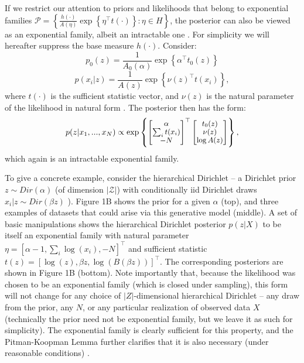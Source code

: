 \documentclass{article}
\begin{document}
If we restrict our attention to priors and likelihoods that belong to exponential families $\mathcal{P} = \left\{ \frac{h(\cdot)}{A(\eta)} \exp\left\{ \eta^\top t(\cdot) \right \} : \eta \in H \right\}$, the posterior can also be viewed as an exponential family, albeit an intractable one \citep{wainwright2008graphical}.  For simplicity we will hereafter suppress the base measure $h(\cdot)$.  Consider:
{\small 
\begin{equation}
 p_0(z) = \frac{1}{A_0(\alpha)} \exp\left\{ \alpha^\top t_0(z) \right\} 
 \label{eq:1}
 \end{equation}
 \begin{equation}
 p(x_i|z) = \frac{1}{A(z)} \exp\left\{ \nu(z)^\top t(x_i) \right \},
\label{eq:2}
 \end{equation} }
where $t(\cdot)$ is the sufficient statistic vector, and $\nu(z)$ is the natural parameter of the likelihood in natural form \citep{robert2007bayesian}.   The posterior then has the form:
\begin{equation}
{\small
  p(z | x_1,...,x_N)  \propto  \exp\left\{ \begin{bmatrix} \alpha \\ \sum_i t(x_i) \\ -N \end{bmatrix}^\top\begin{bmatrix} t_0(z) \\ \nu(z) \\ \log A(z) \end{bmatrix} \right\},
  }
\label{eq:3}
\end{equation}
which again is an intractable exponential family.

To give a concrete example, consider the hierarchical Dirichlet -- a Dirichlet prior $z\sim Dir(\alpha)$ (of dimension $|\mathcal{Z}|$) with conditionally iid Dirichlet draws $x_i | z \sim Dir(\beta z)$ \citep{mackay1995hierarchical,teh2006hdp,blei2003latent, pritchard2000inference}).  
Figure 1B shows the prior for a given $\alpha$ (top), and three examples of datasets that could arise via this generative model (middle).  
A set of basic manipulations shows the hierarchical Dirichlet posterior $p(z|X)$ to be itself an exponential family with natural parameter $\eta = \left[ \alpha -1 , \sum_i \log(x_i) , -N \right]^\top$ and sufficient statistic $t(z) = \left[ \log(z), \beta z , \log(B(\beta z)) \right]^\top$.  The corresponding posteriors are shown in Figure 1B (bottom).  Note importantly that, because the likelihood was chosen to be an exponential family (which is closed under sampling), this form will not change for any choice of $|Z|$-dimensional hierarchical Dirichlet -- any draw from the prior, any $N$, or any particular realization of observed data $X$ (technically the prior need not be exponential family, but we leave it as such for simplicity).  
The exponential family is clearly sufficient for this property, and the Pitman-Koopman Lemma further clarifies that it is also necessary (under reasonable conditions) \citep[\S3.3.3]{robert2007bayesian}.
\end{document}
